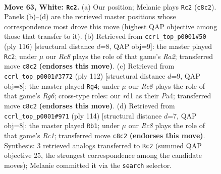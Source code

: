\documentclass[11pt]{article}
\begin{document}
\clearpage

\begin{figure}[p]\centering
\begin{subfigure}{0.46\textwidth}\centering
\resizebox{\linewidth}{!}{%
\newchessgame
\chessboard[
  setfen={2R5/6k1/8/p6r/5K2/1P6/7P/3r4 w - - 0 63},
  showmover=false,
  pgfstyle=straightmove, color=movearrow, markmove={c8-c2}
]}
\caption{}
\end{subfigure}\hfill
\begin{subfigure}{0.46\textwidth}\centering
\resizebox{\linewidth}{!}{%
\newchessgame
\chessboard[
  setfen={8/8/1k3p2/8/5rP1/7K/R7/8 w - - 0 59},
  showmover=false,
  pgfstyle=straightmove, color=movearrow, markmove={a2-c2}
]}
\caption{}
\end{subfigure}
\\[4pt]
\begin{subfigure}{0.46\textwidth}\centering
\resizebox{\linewidth}{!}{%
\newchessgame
\chessboard[
  setfen={8/1k6/p5R1/2p4r/P6P/3K4/8/8 w - - 3 57},
  showmover=false,
  pgfstyle=straightmove, color=movearrow, markmove={g6-g4}
]}
\caption{}
\end{subfigure}\hfill
\begin{subfigure}{0.46\textwidth}\centering
\resizebox{\linewidth}{!}{%
\newchessgame
\chessboard[
  setfen={8/8/1r4p1/1P2k2p/8/5K2/8/2R5 w - - 4 58},
  showmover=false,
  pgfstyle=straightmove, color=movearrow, markmove={c1-b1}
]}
\caption{}
\end{subfigure}
\caption{\textbf{Move 63, White: \texttt{Rc2}.} (a) Our position; Melanie plays \texttt{Rc2} (\texttt{c8c2}). Panels (b)--(d) are the retrieved master positions whose correspondence most drove this move (highest QAP objective among those that transfer to it). (b) Retrieved from \texttt{ccrl\_top\_p0001\#50} (ply 116) [structural distance $d$=8, QAP obj=9]: the master played \texttt{Rc2}; under $\mu$ our \emph{Rc8} plays the role of that game's \emph{Ra2}; transferred move \texttt{c8c2} \textbf{(endorses this move)}. (c) Retrieved from \texttt{ccrl\_top\_p0001\#3772} (ply 112) [structural distance $d$=9, QAP obj=8]: the master played \texttt{Rg4}; under $\mu$ our \emph{Rc8} plays the role of that game's \emph{Rg6}; cross-type roles: our \emph{r}d1 as their \emph{P}a4; transferred move \texttt{c8c2} \textbf{(endorses this move)}. (d) Retrieved from \texttt{ccrl\_top\_p0001\#971} (ply 114) [structural distance $d$=7, QAP obj=8]: the master played \texttt{Rb1}; under $\mu$ our \emph{Rc8} plays the role of that game's \emph{Rc1}; transferred move \texttt{c8c2} \textbf{(endorses this move)}. Synthesis: 3 retrieved analogs transferred to \texttt{Rc2} (summed QAP objective 25, the strongest correspondence among the candidate moves); Melanie committed it via the \texttt{search} selector.}
\label{fig:thought-m124}
\end{figure}
\end{document}
